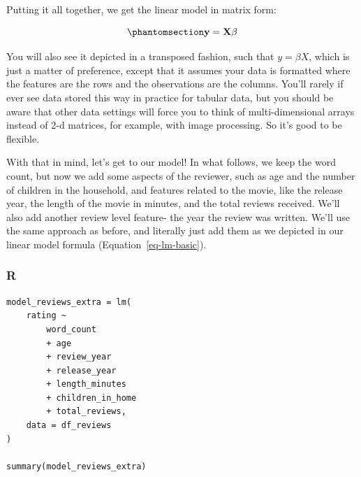 \documentclass[
  letterpaper,
]{krantz}
\begin{document}
\begin{tcolorbox}[enhanced jigsaw, opacityback=0, leftrule=.75mm, bottomrule=.15mm, colframe=quarto-callout-note-color-frame, rightrule=.15mm, breakable, left=2mm, colback=white, arc=.35mm, toprule=.15mm]
Putting it all together, we get the linear model in matrix form:

\begin{equation}\phantomsection\label{eq-lm-mat-mult}{
\bf{y = X\beta }
}\end{equation}

You will also see it depicted in a transposed fashion, such that
\(y = \beta X\), which is just a matter of preference, except that it
assumes your data is formatted where the features are the rows and the
observations are the columns. You'll rarely if ever see data stored this
way in practice for tabular data, but you should be aware that other
data settings will force you to think of multi-dimensional
arrays\footnotemark{} instead of 2-d matrices, for example, with image
processing. So it's good to be flexible.

\end{tcolorbox}


With that in mind, let's get to our model! In what follows, we keep the
word count, but now we add some aspects of the reviewer, such as age and
the number of children in the household, and features related to the
movie, like the release year, the length of the movie in minutes, and
the total reviews received. We'll also add another review level feature-
the year the review was written. We'll use the same approach as before,
and literally just add them as we depicted in our linear model formula
(Equation~\ref{eq-lm-basic}).

\subsubsection{R}

\begin{verbatim}
model_reviews_extra = lm(
    rating ~
        word_count
        + age
        + review_year
        + release_year
        + length_minutes
        + children_in_home
        + total_reviews,
    data = df_reviews
)

summary(model_reviews_extra)
\end{verbatim}
\end{document}
